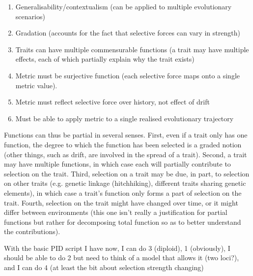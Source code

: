 \documentclass{article}
\begin{document}
\begin{enumerate}
\item Generalisability/contextualism (can be applied to multiple evolutionary scenarios)
\item Gradation (accounts for the fact that selective forces can vary in strength)
\item Traits can have multiple commensurable functions (a trait may have multiple effects, each of which partially explain why the trait exists)
\item Metric must be surjective function (each selective force maps onto a single metric value).
\item Metric must reflect selective force over history, not effect of drift
\item Must be able to apply metric to a single realised evolutionary trajectory
\end{enumerate}

Functions can thus be partial in several senses.
First, even if a trait only has one function, the degree to which the function has been selected is a graded notion (other things, such as drift, are involved in the spread of a trait).
Second, a trait may have multiple functions, in which case each will partially contribute to selection on the trait.
Third, selection on a trait may be due, in part, to selection on other traits (e.g. genetic linkage (hitchhiking), different traits sharing genetic elements), in which case a trait's function only forms a part of selection on the trait.
Fourth, selection on the trait might have changed over time, or it might differ between environments (this one isn't really a justification for partial functions but rather for decomposing total function so as to better understand the contributions).

With the basic PID script I have now, I can do 3 (diploid), 1 (obviously), I should be able to do 2 but need to think of a model that allows it (two loci?), and I can do 4 (at least the bit about selection strength changing)
\end{document}
